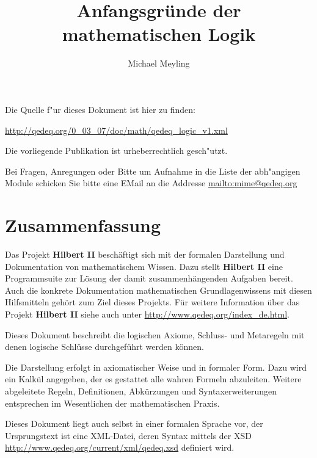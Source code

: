 \documentclass[a4paper,german,10pt,twoside]{book}
\title{Anfangsgr{\"u}nde der mathematischen Logik}
\author{
Michael Meyling
}
\theoremstyle{definition}
\theoremstyle{remark}
\begin{document}
\maketitle

\setlength{\parskip}{5pt plus 2pt minus 1pt}
\mbox{}
\vfill

\par
Die Quelle f{"ur} dieses Dokument ist hier zu finden:
\par
\url{http://qedeq.org/0_03_07/doc/math/qedeq_logic_v1.xml}

\par
Die vorliegende Publikation ist urheberrechtlich gesch{"u}tzt.
\par
Bei Fragen, Anregungen oder Bitte um Aufnahme in die Liste der abh{"a}ngigen Module schicken Sie bitte eine EMail an die Addresse \url{mailto:mime@qedeq.org}

\setlength{\parskip}{0pt}
\tableofcontents

\setlength{\parskip}{5pt plus 2pt minus 1pt}

\chapter*{Zusammenfassung} \label{chapter0} \hypertarget{chapter0}{}

Das Projekt \textbf{Hilbert II} besch{\"a}ftigt sich mit der formalen Darstellung und Dokumentation von mathematischem Wissen. Dazu stellt \textbf{Hilbert II} eine Programmsuite zur L{\"o}sung der damit zusammenh{\"a}ngenden Aufgaben bereit. Auch die konkrete Dokumentation mathematischen Grundlagenwissens mit diesen Hilfsmitteln geh{\"o}rt zum Ziel dieses Projekts. 
F{\"u}r weitere Information {\"u}ber das Projekt \textbf{Hilbert II} siehe auch unter \url{http://www.qedeq.org/index_de.html}.

\par
Dieses Dokument beschreibt die logischen Axiome, Schluss- und Metaregeln mit denen logische Schl{\"u}sse durchgef{\"u}hrt werden k{\"o}nnen.

\par
Die Darstellung erfolgt in axiomatischer Weise und in formaler Form. Dazu wird ein Kalk{\"u}l angegeben, der es gestattet alle wahren Formeln abzuleiten. Weitere abgeleitete Regeln, Definitionen, Abk{\"u}rzungen und Syntaxerweiterungen entsprechen im Wesentlichen der mathematischen Praxis.

\par
Dieses Dokument liegt auch selbst in einer formalen Sprache vor, der Ursprungstext ist eine XML-Datei, deren Syntax mittels der XSD \url{http://www.qedeq.org/current/xml/qedeq.xsd} definiert wird.
\end{document}
